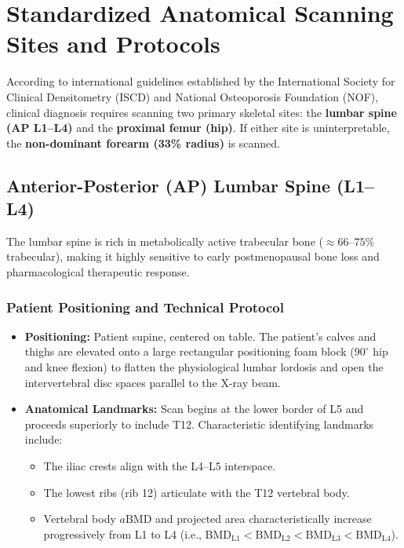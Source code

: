 \documentclass[11pt,a4paper]{article}
\begin{document}
\newpage
\section{Standardized Anatomical Scanning Sites and Protocols}

According to international guidelines established by the International Society for Clinical Densitometry (ISCD) and National Osteoporosis Foundation (NOF), clinical diagnosis requires scanning two primary skeletal sites: the \textbf{lumbar spine (AP L1--L4)} and the \textbf{proximal femur (hip)}. If either site is uninterpretable, the \textbf{non-dominant forearm (33\% radius)} is scanned.

\subsection{Anterior-Posterior (AP) Lumbar Spine (L1--L4)}

The lumbar spine is rich in metabolically active trabecular bone ($\approx 66\text{--}75\%$ trabecular), making it highly sensitive to early postmenopausal bone loss and pharmacological therapeutic response.

\subsubsection{Patient Positioning and Technical Protocol}
\begin{itemize}[leftmargin=*]
    \item \textbf{Positioning:} Patient supine, centered on table. The patient's calves and thighs are elevated onto a large rectangular positioning foam block ($90^\circ$ hip and knee flexion) to flatten the physiological lumbar lordosis and open the intervertebral disc spaces parallel to the X-ray beam.
    \item \textbf{Anatomical Landmarks:} Scan begins at the lower border of L5 and proceeds superiorly to include T12. Characteristic identifying landmarks include:
    \begin{itemize}
        \item The iliac crests align with the L4--L5 interspace.
        \item The lowest ribs (rib 12) articulate with the T12 vertebral body.
        \item Vertebral body $a\text{BMD}$ and projected area characteristically increase progressively from L1 to L4 (i.e., $\text{BMD}_{\text{L1}} < \text{BMD}_{\text{L2}} < \text{BMD}_{\text{L3}} < \text{BMD}_{\text{L4}}$).
    \end{itemize}
\end{itemize}
\end{document}

